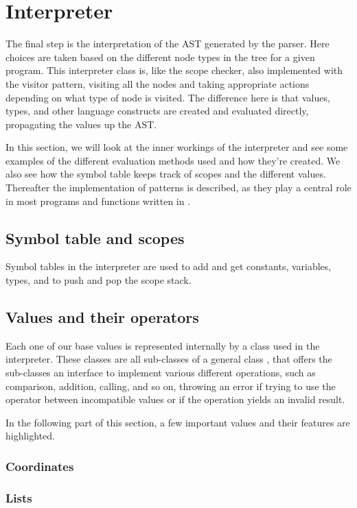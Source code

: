 \section{Interpreter}
The final step is the interpretation of the AST generated by the parser.
Here choices are taken based on the different node types in the tree
for a given program. This interpreter class is, like the scope checker,
also implemented with the visitor pattern, visiting all the nodes and
taking appropriate actions depending on what type of node is visited.
The difference here is that values, types, and other language constructs
are created and evaluated directly, propagating the values up the AST.

In this section, we will look at the inner workings of the interpreter
and see some examples of the different evaluation methods used and how
they're created. We also see how the symbol table keeps track of scopes
and the different values. Thereafter the implementation of patterns is
described, as they play a central role in most programs and functions
written in \productname{}.

\subsection{Symbol table and scopes}
Symbol tables in the interpreter are used to add and get constants, variables, types, and to push and pop the scope stack.

\subsection{Values and their operators}
Each one of our base values is represented internally by a class used in the interpreter. These classes are all sub-classes of a general class , that offers the sub-classes an interface to implement various different operations, such as comparison, addition, calling, and so on, throwing an error if trying to use the operator between incompatible values or if the operation yields an invalid result.

In the following part of this section, a few important values and their features are highlighted.

\subsubsection{Coordinates}

\subsubsection{Lists}

